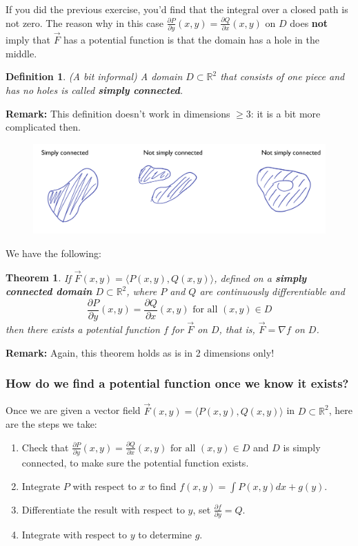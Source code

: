\documentclass[12pt]{article}
\newcommand{\p}{\partial}
\newcommand{\R}{ \mathbb{R}}
\newcommand{\vF}{\vec{F}}
\renewcommand{\lg}{\langle}
\newcommand{\rg}{\rangle}
\newcommand{\Q}{\frac{\p Q}{\p x}}
\renewcommand{\P}{\frac{\p P}{\p y}}
\newtheorem{theorem}{Theorem}
\newtheorem{definition}{Definition}
\begin{document}
If you did the previous exercise, you'd find that the integral over a closed path is not zero. The reason why in this case $\P(x,y)=\Q(x,y)$ on $D$ does \textbf{not} imply that $\vF$ has a potential function is that the domain has a hole in the middle. 

\begin{definition} (A bit informal)
A domain $D\subset \R^2$ that consists of one piece and has no holes is called \textbf{simply connected}.
\end{definition}
\textbf{Remark:} This definition doesn't work in dimensions $\geq 3$: it is a bit more complicated then.

\begin{figure}[h]
\includegraphics[scale=.3]{sets.jpeg}
\end{figure}

We have the following:
\begin{theorem}  If $\vF(x,y)=\lg P(x,y), Q(x,y)\rg$, defined on a \textbf{simply connected domain} $D\subset \R^2$, where $P$ and $Q$ are continuously differentiable and $$\P(x,y)=\Q(x,y)\text{ for all }(x,y)\in D$$ then there exists a potential function $f$ for $\vF$ on $D$, that is, $\vF=\nabla f$ on $D$.%
\end{theorem}

\textbf{Remark:} Again, this theorem holds as is in 2 dimensions only!

\subsubsection*{How do we find a potential function once we know it exists?}
Once we are given a vector field $\vF(x,y)=\lg P(x,y), Q(x,y)\rg$ in $D\subset \R^2$, here are the steps we take:
\begin{enumerate}
\item Check that $\P(x,y)=\Q(x,y)\text{ for all }(x,y)\in D$ and $D$ is simply connected, to make sure the potential function exists.
\item Integrate $P$ with respect to $x$ to find $f(x,y)=\int P(x,y)dx +g(y)$.
\item Differentiate the result with respect to $y$, set $\frac{\p f}{\p y }=Q$.
\item Integrate with respect to $y$ to determine $g$.
\end{enumerate}
\end{document}
